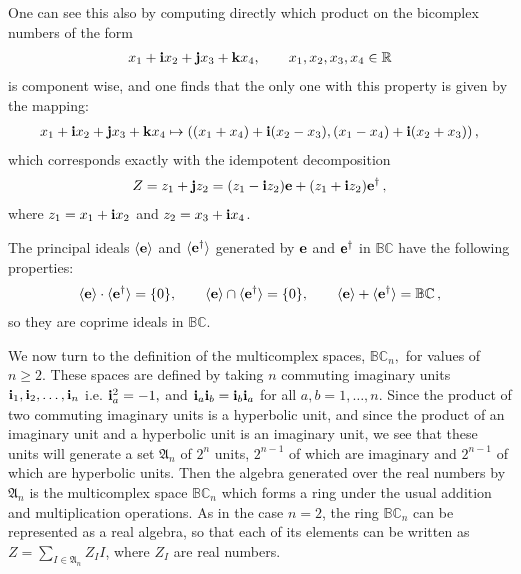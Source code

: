 \documentclass[reqno]{amsart}
\theoremstyle{plain}
\theoremstyle{definition}
\theoremstyle{remark}
\numberwithin{equation}{section}
\begin{document}
One can see this also by computing directly which product on the
bicomplex numbers of the form
\begin{align*}
  x_1 + {{\bf i}} x_2 + {{\bf j}} x_3 + {{\bf k}} x_4,\qquad x_1,x_2,x_3,x_4\in{{\mathbb R}}
\end{align*}
is component wise, and one finds that the only one with this property
is given by the mapping:
\begin{align}
  \label{shakira}
  x_1 + {{\bf i}} x_2 + {{\bf j}} x_3 + {{\bf k}} x_4 \mapsto ((x_1 + x_4) + {{\bf i}} (x_2-x_3), (x_1-x_4) + {{\bf i}} (x_2+x_3))\,,
\end{align}
which corresponds exactly with the idempotent decomposition
\begin{align*}
  Z = z_1 + {{\bf j}} z_2 = (z_1-{{\bf i}} z_2){{\bf e}} + (z_1+{{\bf i}} z_2){{\bf e^\dagger}}\,,
\end{align*}
where $z_1 = x_1+{{\bf i}} x_2$ and $z_2 = x_3+{{\bf i}} x_4$.

\bigskip

The principal ideals ${\langle {{\bf e}} \rangle}$ and ${\langle {{\bf e^\dagger}} \rangle}$ generated by ${{\bf e}}$ and
${{\bf e^\dagger}}$ in ${{\mathbb B}{\mathbb C}}$ have the following properties:
\begin{align*}
  {\langle {{\bf e}} \rangle}\cdot {\langle {{\bf e^\dagger}} \rangle} = \{0\},\qquad
  {\langle {{\bf e}} \rangle} \cap {\langle {{\bf e^\dagger}} \rangle} = \{0\},\qquad
  {\langle {{\bf e}} \rangle} + {\langle {{\bf e^\dagger}} \rangle} = {{\mathbb B}{\mathbb C}}\,,
\end{align*}
so they are coprime ideals in ${{\mathbb B}{\mathbb C}}$.

\bigskip

We now turn to the definition of the multicomplex spaces, ${{\mathbb B}{\mathbb C}}_n,$ for
values of $n\geq 2$. These spaces are defined by taking $n$ commuting
imaginary units ${{\bf i}}_1, {{\bf i}}_2,\dots,{{\bf i}}_n$ i.e. ${{\bf i}}_a^2=-1,$ and
${{\bf i}}_a{{\bf i}}_b={{\bf i}}_b{{\bf i}}_a$ for all $a,b=1,\dots,n.$ Since the product of two
commuting imaginary units is a hyperbolic unit, and since the product
of an imaginary unit and a hyperbolic unit is an imaginary unit, we
see that these units will generate a set $\mathfrak{A}_n$ of $2^n$
units, $2^{n-1}$ of which are imaginary and $2^{n-1}$ of which are
hyperbolic units. Then the algebra generated over the real numbers by
$\mathfrak{A}_n$ is the multicomplex space ${{\mathbb B}{\mathbb C}}_n$ which forms a ring
under the usual addition and multiplication operations. As in the case
$n=2$, the ring ${{\mathbb B}{\mathbb C}}_n$ can be represented as a real algebra, so that
each of its elements can be written as
$Z=\sum_{I\in \mathfrak{A}_n} Z_I I$, where $Z_I$ are real numbers.
\end{document}
